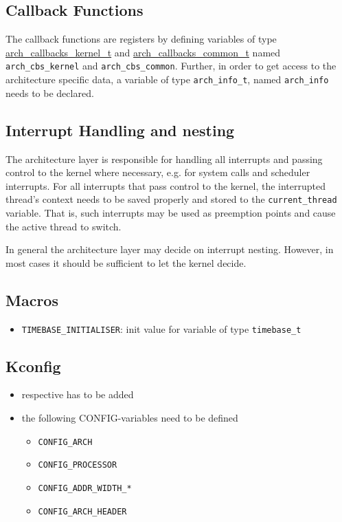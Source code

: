 	\subsection{Callback Functions}
		The callback functions are registers by defining variables of type \hyperref[structarch__callbacks__kernel__t]{arch\_callbacks\_kernel\_t} and \hyperref[structarch__callbacks__common__t]{arch\_callbacks\_common\_t} named \lstinline{arch_cbs_kernel} and \lstinline{arch_cbs_common}. Further, in order to get access to the architecture specific data, a variable of type \lstinline{arch_info_t}, named \lstinline{arch_info} needs to be declared.

	\subsection{Interrupt Handling and nesting}
		The architecture layer is responsible for handling all interrupts and passing control to the kernel where necessary, e.g. for system calls and scheduler interrupts. For all interrupts that pass control to the kernel, the interrupted thread's context needs to be saved properly and stored to the \lstinline{current_thread} variable. That is, such interrupts may be used as preemption points and cause the active thread to switch.

		In general the architecture layer may decide on interrupt nesting. However, in most cases it should be sufficient to let the kernel decide.

	\subsection{Macros}
		\begin{itemize}
			\item \lstinline{TIMEBASE_INITIALISER}: init value for variable of type \lstinline{timebase_t}\\
		\end{itemize}

	\subsection{Kconfig}
		\begin{itemize}
			\item respective  has to be added
			\item the following CONFIG-variables need to be defined
				\begin{itemize}
					\item \lstinline{CONFIG_ARCH}
					\item \lstinline{CONFIG_PROCESSOR}
					\item \lstinline{CONFIG_ADDR_WIDTH_*}
					\item \lstinline{CONFIG_ARCH_HEADER}
				\end{itemize}
		\end{itemize}

